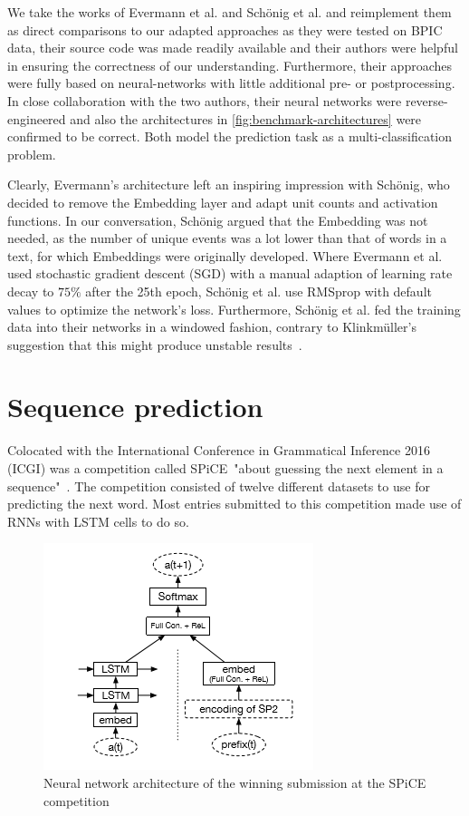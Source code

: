 We take the works of Evermann et al. and Schönig et al. and reimplement them as direct comparisons to our adapted approaches as they were tested on BPIC data, their source code was made readily available and their authors were helpful in ensuring the correctness of our understanding. Furthermore, their approaches were fully based on neural-networks with little additional pre- or postprocessing. In close collaboration with the two authors, their neural networks were reverse-engineered and also the architectures in \autoref{fig:benchmark-architectures} were confirmed to be correct. Both model the prediction task as a multi-classification problem.

Clearly, Evermann's architecture left an inspiring impression with Schönig, who decided to remove the Embedding layer and adapt unit counts and activation functions. In our conversation, Schönig argued that the Embedding was not needed, as the number of unique events was a lot lower than that of words in a text, for which Embeddings were originally developed. Where Evermann et al. used stochastic gradient descent (SGD) with a manual adaption of learning rate decay to $75\%$ after the 25th epoch, Schönig et al. use RMSprop with default values to optimize the network's loss. Furthermore, Schönig et al. fed the training data into their networks in a windowed fashion, contrary to Klinkmüller's suggestion that this might produce unstable results~\cite{klinkmuller2018reliablemonitoring}.

\section{Sequence prediction}
\label{sec:related-work-sequence-prediction}
Colocated with the International Conference in Grammatical Inference 2016 (ICGI) was a competition called SPiCE\ "about guessing the next element in a sequence"~\cite{web:spice}. The competition consisted of twelve different datasets to use for predicting the next word. Most entries submitted to this competition made use of RNNs with LSTM cells to do so.\\

\begin{figure}
    \centering
    \includegraphics[height=.4\textwidth]{gfx/spice-winner-architecture.png}
    \caption{Neural network architecture of the winning submission at the SPiCE competition~\cite{shibata2016bipartite}}
    \label{fig:spice-winner-architecture}
\end{figure}

